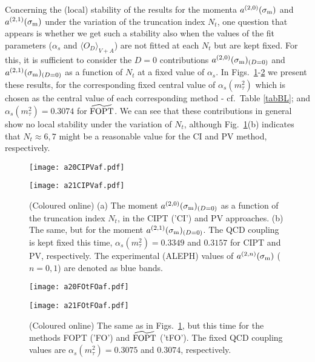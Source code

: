 \documentclass[aps,nofootinbib,showkeys,noshowpacs,preprintnumbers,amsmath,amssymb]{revtex4}
\newcommand{\sm}{{\sigma_{\rm m}}}
\begin{document}
Concerning the (local) stability of the results for the momenta $a^{(2,0)}(\sm)$ and $a^{(2,1)}(\sm)$ under the variation of the truncation index $N_t$, one question that appears is whether we get such a stability also when the values of the fit parameters ($\alpha_s$ and $\langle O_D \rangle_{V+A}$) are not fitted at each $N_t$ but are kept fixed. For this, it is sufficient to consider the $D=0$ contributions $a^{(2,0)}(\sm)_{(D=0)}$ and $a^{(2,1)}(\sm)_{(D=0)}$ as a function of $N_t$ at a fixed value of $\alpha_s$. In Figs.~\ref{aCIPVaf}-\ref{aFOtFOaf} we present these results, for the corresponding fixed central value of $\alpha_s(m^2_{\tau})$ which is chosen as the central value of each corresponding method - cf.~Table \ref{tabBL}; and $\alpha_s(m^2_{\tau})=0.3074$ for ${\widetilde{\rm FOPT}}$. We can see that these contributions in general show no local stability under the variation of $N_t$, although Fig.~\ref{aCIPVaf}(b) indicates that $N_t \approx 6, 7$ might be a reasonable value for the CI and PV method, respectively.
\begin{figure}[htb] 
\begin{minipage}[b]{.49\linewidth}
  \centering\texttt{[image: a20CIPVaf.pdf]}
  \end{minipage}
\begin{minipage}[b]{.49\linewidth}
  \centering\texttt{[image: a21CIPVaf.pdf]}
\end{minipage}
\vspace{-0.2cm}
\caption{\footnotesize  (Coloured online) (a) The moment $a^{(2,0)}(\sm)_{(D=0)}$ as a function of the truncation index $N_t$, in the CIPT ('CI') and PV approaches.   (b) The same, but for the moment $a^{(2,1)}(\sm)_{(D=0)}$. The QCD coupling is kept fixed this time, $\alpha_s(m^2_{\tau})=0.3349$ and $0.3157$ for CIPT and PV, respectively. The experimental (ALEPH) values of $a^{(2,n)}(\sm)$ ($n=0,1$) are denoted as blue bands.}
\label{aCIPVaf}
\end{figure}
\begin{figure}[htb] 
\begin{minipage}[b]{.49\linewidth}
  \centering\texttt{[image: a20FOtFOaf.pdf]}
  \end{minipage}
\begin{minipage}[b]{.49\linewidth}
  \centering\texttt{[image: a21FOtFOaf.pdf]}
\end{minipage}
\vspace{-0.2cm}
\caption{\footnotesize  (Coloured online) The same as in Figs.~\ref{aCIPVaf}, but this time for the methods FOPT ('FO') and  ${\widetilde{\rm FOPT}}$ ('tFO').
  The fixed QCD coupling values are $\alpha_s(m^2_{\tau})=0.3075$ and $0.3074$, respectively.}
\label{aFOtFOaf}
\end{figure}
\end{document}
